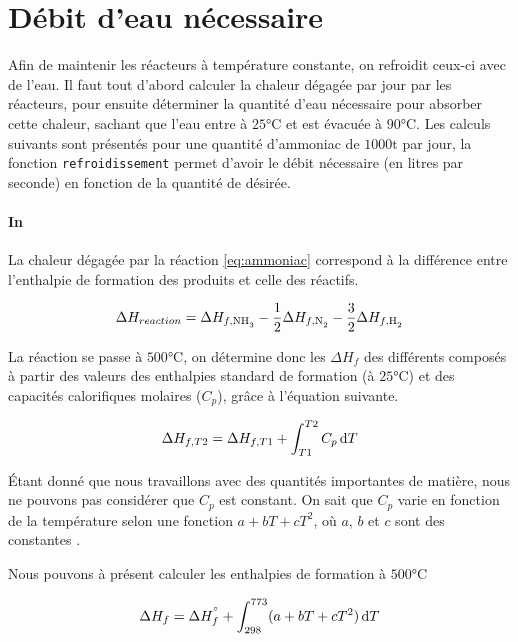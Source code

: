 \section{Débit d'eau nécessaire}

Afin de maintenir les réacteurs à température constante, 
on refroidit ceux-ci avec de l'eau.
Il faut tout d'abord calculer la chaleur dégagée par jour par les réacteurs,
pour ensuite déterminer la quantité d'eau nécessaire pour absorber cette chaleur,
sachant que l'eau entre à $25 \si{\degreeCelsius}$ et 
est évacuée à $90 \si{\degreeCelsius}$.
Les calculs suivants sont présentés pour une quantité d'ammoniac de $1000\si{\tonne}$ par jour, 
la fonction \texttt{refroidissement} permet d'avoir le débit nécessaire (en litres par seconde) 
en fonction de la quantité de  désirée.

\paragraph{In}

La chaleur dégagée par la réaction \ref{eq:ammoniac} correspond à la 
différence entre l'enthalpie de formation des produits et celle des réactifs. 

\begin{equation}
	\Delta H_{reaction} = \Delta H_{f, \ce{NH3}} 
	- \frac{1}{2} \Delta H_{f, \ce{N2}}
	- \frac{3}{2} \Delta H_{f, \ce{H2}}
	\label{eq:enthalpie_reaction}
\end{equation}

La réaction se passe à $500 \si{\degreeCelsius}$, 
on détermine donc les $\Delta H_{f}$ des différents 
composés à partir des valeurs des enthalpies standard
de formation \cite{atkins} (à $25 \si{\degreeCelsius}$)
et des capacités calorifiques molaires ($C_p$), gr\^ace 
à l'équation suivante.

\begin{equation*}
	\Delta H_{f, T2} = \Delta H_{f, T1} 
	+ \int_{T1}^{T2} C_p \, \mathrm{d}T
\end{equation*}

Étant donné que nous travaillons avec des quantités importantes de matière,
nous ne pouvons pas considérer que $C_p$ est constant.
On sait que $C_p$ varie en fonction de la température 
selon une fonction $a + b T + c T^2$, 
où $a$, $b$ et $c$ sont des constantes \cite{capcaloUPMC}. 

Nous pouvons à présent calculer les enthalpies 
de formation à $500 \si{\degreeCelsius}$

\begin{equation}
	\Delta H_f = \Delta H_{f}^{\si{\degree}} + 
	\int_{298}^{773} (a + b T + c T^2) \, \mathrm{d}T
	\label{eq:enthalpie_500C}
\end{equation}

